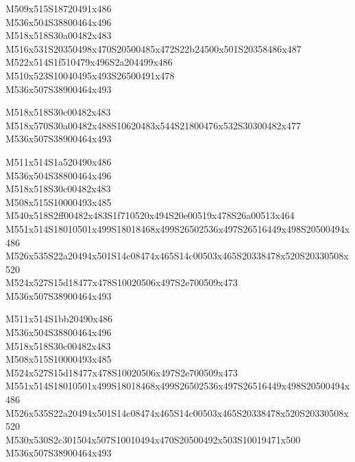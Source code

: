 \documentclass{article}
\begin{document}
\begin{multicols}{5}
\begin{center}

M509x515S18720491x486 %
\\M536x504S38800464x496 %
\\M518x518S30a00482x483 %
\\M516x531S20350498x470S20500485x472S22b24500x501S20358486x487 %
\\M522x514S1f510479x496S2a204499x486 %
\\M510x523S10040495x493S26500491x478 %
\\M536x507S38900464x493 %

M518x518S30c00482x483 %
\\M518x570S30a00482x488S10620483x544S21800476x532S30300482x477 %
\\M536x507S38900464x493 %
\vfil
\columnbreak

M511x514S1a520490x486 %
\\M536x504S38800464x496 %
\\M518x518S30c00482x483 %
\\M508x515S10000493x485 %
\\M540x518S2ff00482x483S1f710520x494S20e00519x478S26a00513x464 %
\\M551x514S18010501x499S18018468x499S26502536x497S26516449x498S20500494x486 %
\\M526x535S22a20494x501S14c08474x465S14c00503x465S20338478x520S20330508x520 %
\\M524x527S15d18477x478S10020506x497S2e700509x473 %
\\M536x507S38900464x493 %
\vfil
\columnbreak

M511x514S1bb20490x486 %
\\M536x504S38800464x496 %
\\M518x518S30c00482x483 %
\\M508x515S10000493x485 %
\\M524x527S15d18477x478S10020506x497S2e700509x473 %
\\M551x514S18010501x499S18018468x499S26502536x497S26516449x498S20500494x486 %
\\M526x535S22a20494x501S14c08474x465S14c00503x465S20338478x520S20330508x520 %
\\M530x530S2c301504x507S10010494x470S20500492x503S10019471x500 %
\\M536x507S38900464x493 %
\vfil
\columnbreak


\end{center}
\end{multicols}
\end{document}
